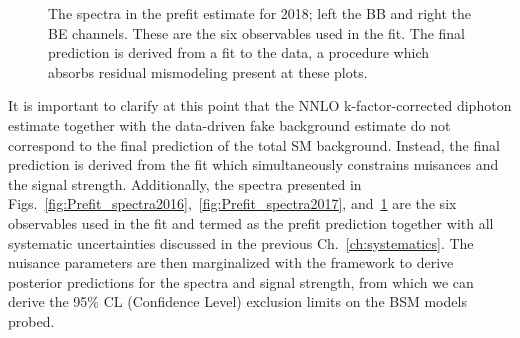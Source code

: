 \begin{figure}[!htbp]{
\caption{The \mgg spectra in the prefit estimate for 2018; left the BB and right the BE channels.
These are the six observables used in the fit.
The final prediction is derived from a fit to the data, a procedure which absorbs residual mismodeling present at these plots.}
\label{fig:Prefit_spectra2018}}
\end{figure}

It is important to clarify at this point that the NNLO k-factor-corrected diphoton estimate together with the data-driven fake background estimate do not correspond to the final prediction of the total SM background. Instead, the final prediction is derived from the fit which simultaneously constrains nuisances and the signal strength. Additionally, the \mgg spectra presented in Figs.~\ref{fig:Prefit_spectra2016},~\ref{fig:Prefit_spectra2017}, and~\ref{fig:Prefit_spectra2018}  are the six observables used in the fit and termed as the prefit prediction together with all systematic uncertainties discussed in the previous Ch.~\ref{ch:systematics}. The nuisance parameters are then marginalized with the \THETA framework to derive posterior predictions for the \mgg spectra and signal strength, from which we can derive the 95\% CL (Confidence Level) exclusion limits on the BSM models probed. %


